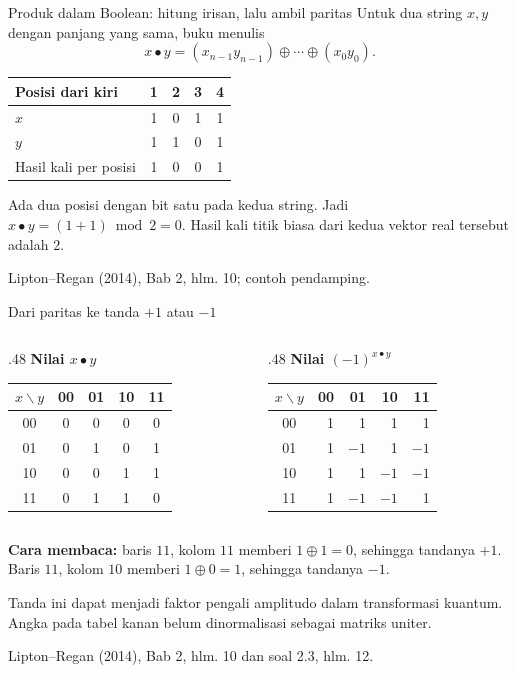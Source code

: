\documentclass[aspectratio=169,11pt]{beamer}
\newcommand{\bookref}[1]{\par\vfill{\scriptsize\color{gray}Lipton--Regan (2014), Bab 2, #1.}}
\begin{document}
\begin{frame}{Produk dalam Boolean: hitung irisan, lalu ambil paritas}
Untuk dua string $x,y$ dengan panjang yang sama, buku menulis
\[
x\bullet y=(x_{n-1}y_{n-1})\oplus\cdots\oplus(x_0y_0).
\]
\begin{center}
\begin{tabular}{lcccc}\toprule
Posisi dari kiri &1&2&3&4\\\midrule
$x$ &1&0&1&1\\
$y$ &1&1&0&1\\
Hasil kali per posisi &1&0&0&1\\\bottomrule
\end{tabular}\end{center}
Ada dua posisi dengan bit satu pada kedua string. Jadi $x\bullet y=(1+1)\bmod 2=0$. Hasil kali titik biasa dari kedua vektor real tersebut adalah $2$.
\bookref{hlm. 10; contoh pendamping}
\end{frame}

\begin{frame}{Dari paritas ke tanda $+1$ atau $-1$}
\begin{columns}[T]
\begin{column}{.48\textwidth}\centering
\textbf{Nilai $x\bullet y$}\\[2mm]
\begin{tabular}{c|cccc}
$x\backslash y$&00&01&10&11\\\hline
00&0&0&0&0\\01&0&1&0&1\\10&0&0&1&1\\11&0&1&1&0
\end{tabular}
\end{column}
\begin{column}{.48\textwidth}\centering
\textbf{Nilai $(-1)^{x\bullet y}$}\\[2mm]
\begin{tabular}{c|rrrr}
$x\backslash y$&00&01&10&11\\\hline
00&1&1&1&1\\01&1&$-1$&1&$-1$\\10&1&1&$-1$&$-1$\\11&1&$-1$&$-1$&1
\end{tabular}
\end{column}\end{columns}
\bigskip
\textbf{Cara membaca:} baris $11$, kolom $11$ memberi $1\oplus1=0$, sehingga tandanya $+1$. Baris $11$, kolom $10$ memberi $1\oplus0=1$, sehingga tandanya $-1$.
\par\medskip Tanda ini dapat menjadi faktor pengali amplitudo dalam transformasi kuantum. Angka pada tabel kanan belum dinormalisasi sebagai matriks uniter.
\bookref{hlm. 10 dan soal 2.3, hlm. 12}
\end{frame}
\end{document}
